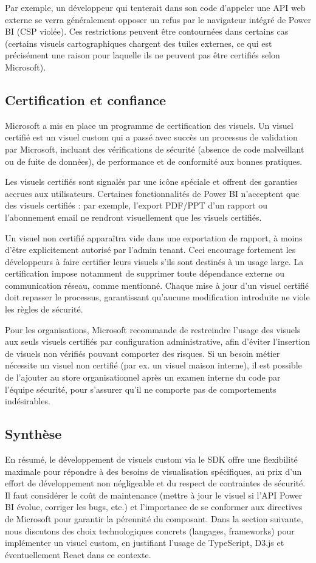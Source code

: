 Par exemple, un développeur qui tenterait dans son code d’appeler une API web externe se verra généralement opposer un refus par le navigateur intégré de Power BI (CSP violée). Ces restrictions peuvent être contournées dans certains cas (certains visuels cartographiques chargent des tuiles externes, ce qui est précisément une raison pour laquelle ils ne peuvent pas être certifiés selon Microsoft\parencite{MediumTiles}).

\subsection*{Certification et confiance}
Microsoft a mis en place un programme de certification des visuels. Un visuel certifié est un visuel custom qui a passé avec succès un processus de validation par Microsoft, incluant des vérifications de sécurité (absence de code malveillant ou de fuite de données), de performance et de conformité aux bonnes pratiques\parencite{MediumCertification}.

Les visuels certifiés sont signalés par une icône spéciale et offrent des garanties accrues aux utilisateurs. Certaines fonctionnalités de Power BI n’acceptent que des visuels certifiés : par exemple, l’export PDF/PPT d’un rapport ou l’abonnement email ne rendront visuellement que les visuels certifiés\parencite{OkVizExport}.

Un visuel non certifié apparaîtra vide dans une exportation de rapport, à moins d’être explicitement autorisé par l’admin tenant. Ceci encourage fortement les développeurs à faire certifier leurs visuels s’ils sont destinés à un usage large. La certification impose notamment de supprimer toute dépendance externe ou communication réseau, comme mentionné. Chaque mise à jour d’un visuel certifié doit repasser le processus, garantissant qu’aucune modification introduite ne viole les règles de sécurité.

Pour les organisations, Microsoft recommande de restreindre l’usage des visuels aux seuls visuels certifiés par configuration administrative, afin d’éviter l’insertion de visuels non vérifiés pouvant comporter des risques. Si un besoin métier nécessite un visuel non certifié (par ex. un visuel maison interne), il est possible de l’ajouter au store organisationnel après un examen interne du code par l’équipe sécurité, pour s’assurer qu’il ne comporte pas de comportements indésirables.

\subsection*{Synthèse}
En résumé, le développement de visuels custom via le SDK offre une flexibilité maximale pour répondre à des besoins de visualisation spécifiques, au prix d’un effort de développement non négligeable et du respect de contraintes de sécurité. Il faut considérer le coût de maintenance (mettre à jour le visuel si l’API Power BI évolue, corriger les bugs, etc.) et l’importance de se conformer aux directives de Microsoft pour garantir la pérennité du composant. Dans la section suivante, nous discutons des choix technologiques concrets (langages, frameworks) pour implémenter un visuel custom, en justifiant l’usage de TypeScript, D3.js et éventuellement React dans ce contexte.
